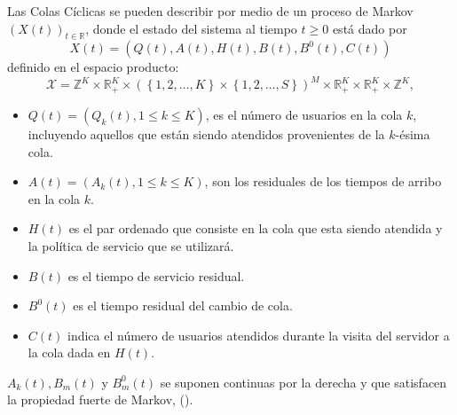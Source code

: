 \documentclass{article}
\newcommand{\rea}{\mathbb{R}}
\begin{document}
Las Colas C\'iclicas se pueden describir por medio de un proceso de Markov $\left(X\left(t\right)\right)_{t\in\rea}$, donde el estado del sistema al tiempo $t\geq0$ est\'a dado por
\begin{equation}
X\left(t\right)=\left(Q\left(t\right),A\left(t\right),H\left(t\right),B\left(t\right),B^{0}\left(t\right),C\left(t\right)\right)
\end{equation}
definido en el espacio producto:
\begin{equation}
\mathcal{X}=\mathbb{Z}^{K}\times\rea_{+}^{K}\times\left(\left\{1,2,\ldots,K\right\}\times\left\{1,2,\ldots,S\right\}\right)^{M}\times\rea_{+}^{K}\times\rea_{+}^{K}\times\mathbb{Z}^{K},
\end{equation}

\begin{itemize}
\item $Q\left(t\right)=\left(Q_{k}\left(t\right),1\leq k\leq K\right)$, es el n\'umero de usuarios en la cola $k$, incluyendo aquellos que est\'an siendo atendidos provenientes de la $k$-\'esima cola.

\item $A\left(t\right)=\left(A_{k}\left(t\right),1\leq k\leq
 K\right)$, son los residuales de los tiempos de arribo en la cola $k$. \item $H\left(t\right)$ es el par ordenado que consiste en la cola que esta siendo atendida y la pol\'itica de servicio que se utilizar\'a.

\item $B\left(t\right)$ es el tiempo de servicio residual.

\item $B^{0}\left(t\right)$ es el tiempo residual del cambio de cola.

\item $C\left(t\right)$ indica el n\'umero de usuarios atendidos durante la visita del servidor a la cola dada en $H\left(t\right)$.
\end{itemize}

$A_{k}\left(t\right),B_{m}\left(t\right)$ y $B_{m}^{0}\left(t\right)$ se suponen continuas por la derecha y que satisfacen la propiedad fuerte de Markov, (\cite{Dai}).
\end{document}

